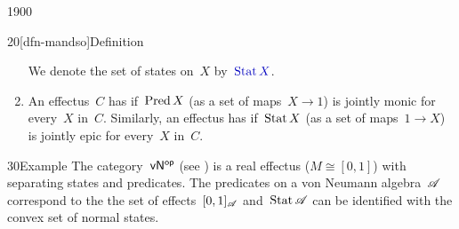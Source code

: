 \begin{parsec}{1900}
\begin{point}{20}[dfn-mandso]{Definition}
\begin{enumerate}
We denote the set of states on~$X$ by~$\Define{\Stat X}$.
\item
An effectus~$C$ has 
        if~$\operatorname{Pred} X$ (as a set of maps~$X \to 1$)
        is jointly monic for every~$X$ in~$C$.
    Similarly, an effectus has 
        if~$\operatorname{Stat} X$ (as a set of maps~$1 \to X$)
        is jointly epic for every~$X$ in~$C$.
\end{enumerate}
\end{point}
\begin{point}{30}{Example}%
    The category~${\mathsf{vN}}{^{\mathsf{op}}}$ (see )
    is a real effectus ($M \cong [0,1]$)
    with separating states and predicates.
The predicates on a von Neumann algebra~$\mathscr{A}$
    correspond to the the set of effects~$[0,1]_{\mathscr{A}}$
    and~$\operatorname{Stat} \mathscr{A}$ can be identified with the convex set of normal states.
\end{point}
\end{parsec}
